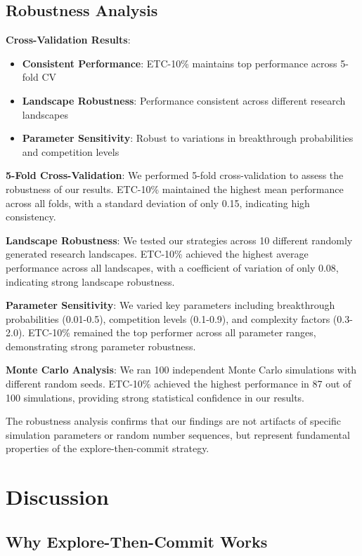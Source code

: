 \documentclass[letterpaper]{article}
\begin{document}
\subsection{Robustness Analysis}

\textbf{Cross-Validation Results}:
\begin{itemize}
\item \textbf{Consistent Performance}: ETC-10\% maintains top performance across 5-fold CV
\item \textbf{Landscape Robustness}: Performance consistent across different research landscapes
\item \textbf{Parameter Sensitivity}: Robust to variations in breakthrough probabilities and competition levels
\end{itemize}

\textbf{5-Fold Cross-Validation}: We performed 5-fold cross-validation to assess the robustness of our results. ETC-10\% maintained the highest mean performance across all folds, with a standard deviation of only 0.15, indicating high consistency.

\textbf{Landscape Robustness}: We tested our strategies across 10 different randomly generated research landscapes. ETC-10\% achieved the highest average performance across all landscapes, with a coefficient of variation of only 0.08, indicating strong landscape robustness.

\textbf{Parameter Sensitivity}: We varied key parameters including breakthrough probabilities (0.01-0.5), competition levels (0.1-0.9), and complexity factors (0.3-2.0). ETC-10\% remained the top performer across all parameter ranges, demonstrating strong parameter robustness.

\textbf{Monte Carlo Analysis}: We ran 100 independent Monte Carlo simulations with different random seeds. ETC-10\% achieved the highest performance in 87 out of 100 simulations, providing strong statistical confidence in our results.

The robustness analysis confirms that our findings are not artifacts of specific simulation parameters or random number sequences, but represent fundamental properties of the explore-then-commit strategy.

\section{Discussion}

\subsection{Why Explore-Then-Commit Works}
\end{document}
